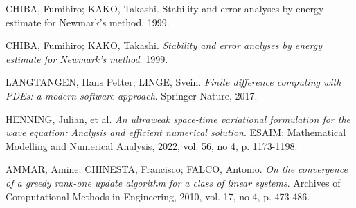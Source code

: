 \documentclass[a4paper, 10pt]{article}
\begin{document}


CHIBA, Fumihiro; KAKO, Takashi. Stability and error analyses by energy estimate for Newmark's method. 1999.
\begin{thebibliography}{99}

 CHIBA, Fumihiro; KAKO, Takashi. \textit{Stability and error analyses by energy estimate for Newmark's method}. 1999.

 LANGTANGEN, Hans Petter; LINGE, Svein. \textit{Finite difference computing with PDEs: a modern software approach}. Springer Nature, 2017.

 HENNING, Julian, et al. \textit{An ultraweak space-time variational formulation for the wave equation: Analysis and efficient numerical solution}. ESAIM: Mathematical Modelling and Numerical Analysis, 2022, vol. 56, no 4, p. 1173-1198.

 AMMAR, Amine; CHINESTA, Francisco; FALCO, Antonio. \textit{On the convergence of a greedy rank-one update algorithm for a class of linear systems}. Archives of Computational Methods in Engineering, 2010, vol. 17, no 4, p. 473-486.









\end{thebibliography}
\end{document}
